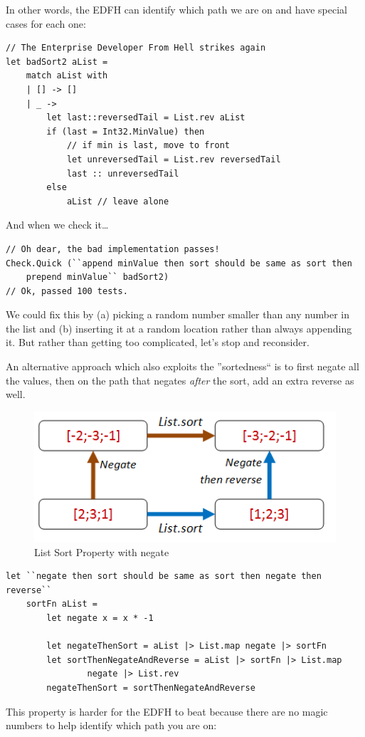 In other words, the EDFH can identify which path we are on and have special cases for each one:

\begin{verbatim}
// The Enterprise Developer From Hell strikes again
let badSort2 aList = 
	match aList with
	| [] -> []
	| _ -> 
		let last::reversedTail = List.rev aList 
		if (last = Int32.MinValue) then
			// if min is last, move to front
			let unreversedTail = List.rev reversedTail
			last :: unreversedTail 
		else
			aList // leave alone
\end{verbatim}
And when we check it\ldots

\begin{verbatim}
// Oh dear, the bad implementation passes!
Check.Quick (``append minValue then sort should be same as sort then 
    prepend minValue`` badSort2)
// Ok, passed 100 tests.
\end{verbatim}
We could fix this by (a) picking a random number smaller than any number in the list and (b) inserting it at a random location rather than always appending it. But rather than getting too complicated, let's stop and reconsider.

An alternative approach which also exploits the ''sortedness`` is to first negate all the values, then on the path that negates \textit{after} the sort, add an extra reverse as well.
\begin{figure}[htbp]
 \centering
 \includegraphics[width=.95\linewidth]{./pics/choosing_properties_11.png}
 \caption{List Sort Property with negate}
 \label{fig:choosing_properties_11}
\end{figure}
\begin{verbatim}
let ``negate then sort should be same as sort then negate then reverse`` 
    sortFn aList = 
        let negate x = x * -1

        let negateThenSort = aList |> List.map negate |> sortFn 
        let sortThenNegateAndReverse = aList |> sortFn |> List.map 
                negate |> List.rev
        negateThenSort = sortThenNegateAndReverse 
\end{verbatim}
This property is harder for the EDFH to beat because there are no magic numbers to help identify which path you are on:

